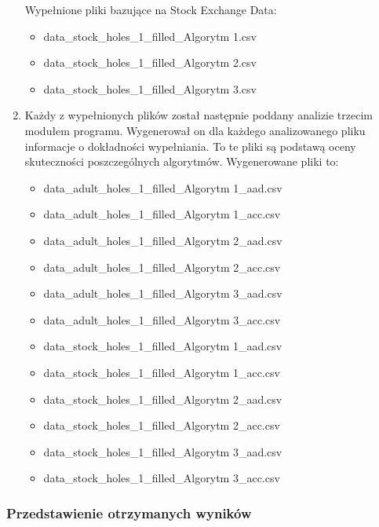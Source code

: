 \documentclass[12pt,twoside]{article}
\begin{document}
\begin{enumerate}[label=\arabic*), leftmargin=1.25cm]
          Wypełnione pliki bazujące na Stock Exchange Data:
          \begin{itemize}[label=-,labelsep=0.4cm, leftmargin=1.25cm]
              \item data\_stock\_holes\_1\_filled\_Algorytm 1.csv
              \item data\_stock\_holes\_1\_filled\_Algorytm 2.csv
              \item data\_stock\_holes\_1\_filled\_Algorytm 3.csv
          \end{itemize}
    \item Każdy z wypełnionych plików został następnie poddany analizie trzecim modułem programu.
          Wygenerował on dla każdego analizowanego pliku informacje o dokładności wypełniania.
          To te pliki są podstawą oceny skuteczności poszczególnych algorytmów.
          Wygenerowane pliki to:
          \begin{itemize}[label=-,labelsep=0.4cm, leftmargin=1.25cm]
              \item data\_adult\_holes\_1\_filled\_Algorytm 1\_aad.csv
              \item data\_adult\_holes\_1\_filled\_Algorytm 1\_acc.csv
              \item data\_adult\_holes\_1\_filled\_Algorytm 2\_aad.csv
              \item data\_adult\_holes\_1\_filled\_Algorytm 2\_acc.csv
              \item data\_adult\_holes\_1\_filled\_Algorytm 3\_aad.csv
              \item data\_adult\_holes\_1\_filled\_Algorytm 3\_acc.csv
              \item data\_stock\_holes\_1\_filled\_Algorytm 1\_aad.csv
              \item data\_stock\_holes\_1\_filled\_Algorytm 1\_acc.csv
              \item data\_stock\_holes\_1\_filled\_Algorytm 2\_aad.csv
              \item data\_stock\_holes\_1\_filled\_Algorytm 2\_acc.csv
              \item data\_stock\_holes\_1\_filled\_Algorytm 3\_aad.csv
              \item data\_stock\_holes\_1\_filled\_Algorytm 3\_acc.csv
          \end{itemize}
\end{enumerate}

\subsubsection{Przedstawienie otrzymanych wyników}
\end{document}
